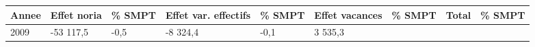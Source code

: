 \begin{longtable}[]{@{}lllllllll@{}}
\toprule
\begin{minipage}[b]{0.05\columnwidth}\raggedright
Annee\strut
\end{minipage} & \begin{minipage}[b]{0.10\columnwidth}\raggedright
Effet noria\strut
\end{minipage} & \begin{minipage}[b]{0.06\columnwidth}\raggedright
\% SMPT\strut
\end{minipage} & \begin{minipage}[b]{0.16\columnwidth}\raggedright
Effet var. effectifs\strut
\end{minipage} & \begin{minipage}[b]{0.06\columnwidth}\raggedright
\% SMPT\strut
\end{minipage} & \begin{minipage}[b]{0.12\columnwidth}\raggedright
Effet vacances\strut
\end{minipage} & \begin{minipage}[b]{0.06\columnwidth}\raggedright
\% SMPT\strut
\end{minipage} & \begin{minipage}[b]{0.09\columnwidth}\raggedright
Total\strut
\end{minipage} & \begin{minipage}[b]{0.06\columnwidth}\raggedright
\% SMPT\strut
\end{minipage}\tabularnewline
\midrule
\endhead
\begin{minipage}[t]{0.05\columnwidth}\raggedright
2009\strut
\end{minipage} & \begin{minipage}[t]{0.10\columnwidth}\raggedright
-53 117,5\strut
\end{minipage} & \begin{minipage}[t]{0.06\columnwidth}\raggedright
-0,5\strut
\end{minipage} & \begin{minipage}[t]{0.16\columnwidth}\raggedright
-8 324,4\strut
\end{minipage} & \begin{minipage}[t]{0.06\columnwidth}\raggedright
-0,1\strut
\end{minipage} & \begin{minipage}[t]{0.12\columnwidth}\raggedright
3 535,3\strut
\end{minipage} & \begin{minipage}[t]{0.06\columnwidth}\raggedright

\end{minipage}
\end{longtable}
